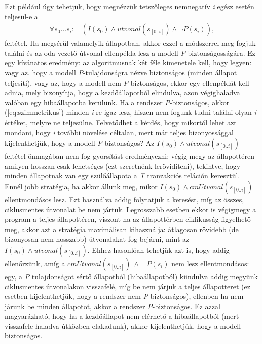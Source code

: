 Ezt például úgy tehetjük, hogy megnézzük tetszőleges nemnegatív \emph{i} egész esetén teljesül-e a
\begin{align}
	\label{eq:szimmetrikus}
	\forall s_{0} \dots s_{i}:~\neg(I(s_{0}) \wedge \mathit{utvonal}(s_{[0..i]}) \wedge \neg P(s_{i})),
\end{align}
feltétel. Ha megsérül valamelyik állapotban, akkor ezzel a módszerrel meg fogjuk találni és az oda vezető útvonal ellenpélda lesz a modell \emph{P}-biztonságosságára. Ez egy kívánatos eredmény: az algoritmusnak két féle kimenetele kell, hogy legyen: vagy az, hogy a modell \emph{P}-tulajdonságra nézve biztonságos (minden állapot teljesíti), vagy az, hogy a modell nem \emph{P}-biztonságos, ekkor egy ellenpéldát kell adnia, mely bizonyítja, hogy a  kezdőállapotból elindulva, azon végighaladva valóban egy hibaállapotba kerülünk.
\newline
\newline
Ha a rendszer \emph{P}-biztonságos, akkor (\ref{eq:szimmetrikus}) minden \emph{i}-re igaz lesz, hiszen nem fogunk tudni találni olyan \emph{i} értéket, melyre ne teljesülne. Felvetődhet a kérdés, hogy mikortól lehet azt mondani, hogy \emph{i} további növelése céltalan, mert már teljes bizonyossággal kijelenthetjük, hogy a modell \emph{P}-biztonságos? Az $I(s_{0}) \wedge \mathit{utvonal}(s_{[0..i]})$ feltétel önmagában nem fog gyorsítást eredményezni: végig megy az állapottéren amilyen hosszan csak lehetséges (ezt szeretnénk lerövidíteni), tekintve, hogy minden állapotnak van egy szülőállapota a \emph{T} tranzakciós reláción keresztül.
\newline
\newline
Ennél jobb stratégia, ha akkor állunk meg, mikor $I(s_{0}) \wedge  \mathit{cmUtvonal}(s_{[0..i]})$ ellentmondásos lesz. Ezt használva addig folytatjuk a keresést, míg az összes, ciklusmentes útvonalat be nem jártuk. Legrosszabb esetben ekkor is végigmegy a program a teljes állapottéren, viszont ha az állapottérben ciklikusság figyelhető meg, akkor azt a stratégia maximálisan kihasználja: átlagosan rövidebb (de bizonyosan nem hosszabb) útvonalakat fog bejárni, mint az $I(s_{0}) \wedge \mathit{utvonal}(s_{[0..i]})$.
\newline
\newline
Ehhez hasonlóan tehetjük azt is, hogy addig ellenőrzünk, amíg a $\mathit{cmUtvonal}(s_{[0..i]})~\wedge~\neg P(s_{i})$ nem lesz ellentmondásos: egy, a \emph{P} tulajdonságot sértő állapotból (hibaállapotból) kiindulva addig megyünk ciklusmentes útvonalakon visszafelé, míg be nem járjuk a teljes állapotteret (ez esetben kijelenthetjük, hogy a rendszer nem-\emph{P}-biztonságos), ellenben ha nem járunk be minden állapotot, akkor a rendszer \emph{P}-biztonságos. Ez azzal magyarázható, hogy ha a kezdőállapot nem elérhető a hibaállapotból (mert visszafele haladva útközben elakadunk), akkor kijelenthetjük, hogy a modell biztonságos.
